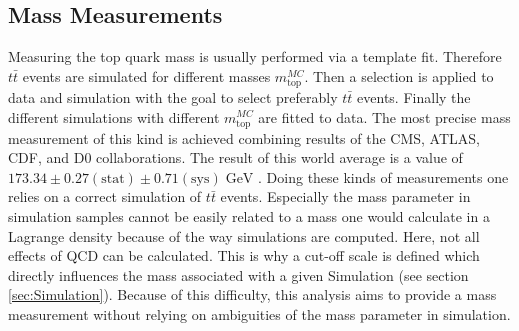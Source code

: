 	\subsection{Mass Measurements}
	Measuring the top quark mass is usually performed via a template fit. Therefore $t\bar{t}$ events are simulated for different masses $m_\text{top}^{MC}$. Then a selection is applied to data and simulation with the goal to select preferably $t\bar{t}$ events. Finally the different simulations with different $m_\text{top}^{MC}$ are fitted to data. The most precise mass measurement of this kind is achieved combining results of the CMS, ATLAS, CDF, and D0 collaborations. The result of this world average is a value of $173.34 \pm 0.27 (\text{stat}) \pm 0.71 (\text{sys})\;\text{GeV}$ \cite{topmass_combination}. Doing these kinds of measurements one relies on a correct simulation of $t\bar{t}$ events. Especially the mass parameter in simulation samples cannot be easily related to a mass one would calculate in a Lagrange density because of the way simulations are computed. Here, not all effects of QCD can be calculated. This is why a cut-off scale is defined which directly influences the mass associated with a given Simulation (see section \ref{sec:Simulation}). Because of this difficulty, this analysis aims to provide a mass measurement without relying on ambiguities of the mass parameter in simulation.
	